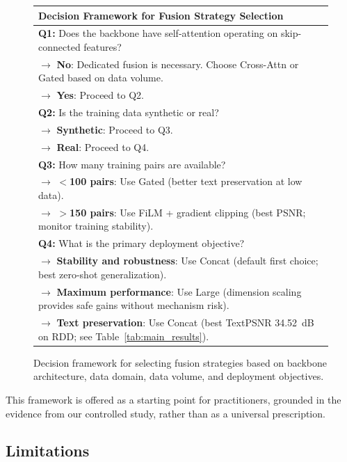 \documentclass[pdflatex,sn-basic,Numbered]{sn-jnl}
\theoremstyle{thmstyleone}
\theoremstyle{thmstyletwo}
\theoremstyle{thmstylethree}
\begin{document}
\begin{figure}[t]
\centering
\begin{tabular}{@{}p{}@{}}
\toprule
\textbf{Decision Framework for Fusion Strategy Selection} \\
\midrule
\textbf{Q1:} Does the backbone have self-attention operating on skip-connected features? \\
\quad $\rightarrow$ \textbf{No}: Dedicated fusion is necessary. Choose Cross-Attn or Gated based on data volume. \\
\quad $\rightarrow$ \textbf{Yes}: Proceed to Q2. \\
\textbf{Q2:} Is the training data synthetic or real? \\
\quad $\rightarrow$ \textbf{Synthetic}: Proceed to Q3. \\
\quad $\rightarrow$ \textbf{Real}: Proceed to Q4. \\
\textbf{Q3:} How many training pairs are available? \\
\quad $\rightarrow$ \textbf{$<$100 pairs}: Use Gated (better text preservation at low data). \\
\quad $\rightarrow$ \textbf{$>$150 pairs}: Use FiLM + gradient clipping (best PSNR; monitor training stability). \\
\textbf{Q4:} What is the primary deployment objective? \\
\quad $\rightarrow$ \textbf{Stability and robustness}: Use Concat (default first choice; best zero-shot generalization). \\
\quad $\rightarrow$ \textbf{Maximum performance}: Use Large (dimension scaling provides safe gains without mechanism risk). \\
\quad $\rightarrow$ \textbf{Text preservation}: Use Concat (best TextPSNR 34.52~dB on RDD; see Table~\ref{tab:main_results}). \\
\bottomrule
\end{tabular}
\caption{Decision framework for selecting fusion strategies based on backbone architecture, data domain, data volume, and deployment objectives.}
\label{fig:decision}
\end{figure}

This framework is offered as a starting point for practitioners, grounded in the evidence from our controlled study, rather than as a universal prescription.

\subsection{Limitations}
\end{document}
